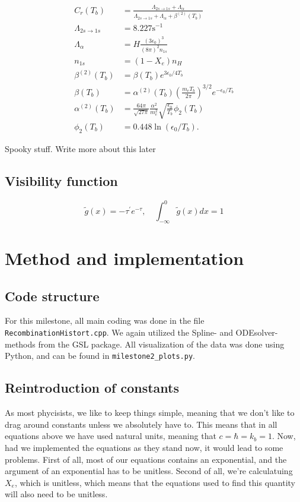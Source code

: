 \documentclass[12pt]{article}
\begin{document}
\begin{align*}\label{eq: peebles components}
        C_{r}\left(T_{b}\right) &=\frac{\Lambda_{2 s \rightarrow 1 s}+\Lambda_{\alpha}}{\Lambda_{2 s \rightarrow 1 s}+\Lambda_{\alpha}+\beta^{(2)}\left(T_{b}\right)} \\
        \Lambda_{2 s \rightarrow 1 s} &=8.227 \mathrm{s}^{-1} \\
        \Lambda_{\alpha} &=H \frac{\left(3 \epsilon_{0}\right)^{3}}{(8 \pi)^{2} n_{1 s}} \\
        n_{1 s} &=\left(1-X_{e}\right) n_{H} \\
        \beta^{(2)}\left(T_{b}\right) &=\beta\left(T_{b}\right) e^{3 \epsilon_{0} / 4 T_{b}} \\
        \beta\left(T_{b}\right) &=\alpha^{(2)}\left(T_{b}\right)\left(\frac{m_{e} T_{b}}{2 \pi}\right)^{3 / 2} e^{-\epsilon_{0} / T_{b}} \\
        \alpha^{(2)}\left(T_{b}\right) &=\frac{64 \pi}{\sqrt{27 \pi}} \frac{\alpha^{2}}{m_{e}^{2}} \sqrt{\frac{\epsilon_{0}}{T_{b}}} \phi_{2}\left(T_{b}\right) \\
        \phi_{2}\left(T_{b}\right) &=0.448 \ln \left(\epsilon_{0} / T_{b}\right).
\end{align*}

Spooky stuff. Write more about this later


\subsection{Visibility function}
\begin{equation}
    \tilde{g}(x)=-\tau^{\prime} e^{-\tau}, \quad \int_{-\infty}^{0} \tilde{g}(x) d x=1
\end{equation}

\section{Method and implementation}
\subsection{Code structure}
For this milestone, all main coding was done in the file \texttt{RecombinationHistort.cpp}. We again utilized the Spline- and ODEsolver-methods from the GSL package. All visualization of the data was done using Python, and can be found in \texttt{milestone2\_plots.py}.

\subsection{Reintroduction of constants}
As most phycisists, we like to keep things simple, meaning that we don't like to drag around constants unless we absolutely have to. This means that in all equations above we have used natural units, meaning that $c = \hbar = k_b = 1$. Now, had we implemented the equations as they stand now, it would lead to some problems. First of all, most of our equations contains an exponential, and the argument of an exponential has to be unitless. Second of all, we're calculatuing $X_e$, which is unitless, which means that the equations used to find this quantity will also need to be unitless.
\end{document}
